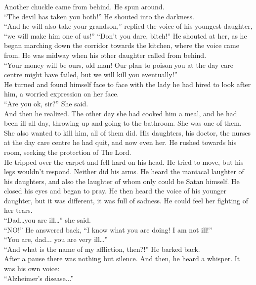 \documentclass[a4paper,onecolumn,11pt]{article}
\begin{document}
\newline
Another chuckle came from behind. He spun around.\\
``The devil has taken you both!'' He shouted into the darkness.\\
``And he will also take your grandson,'' replied the voice of his youngest daughter, ``we will make him one of us!''
``Don't you dare, bitch!'' He shouted at her, as he began marching down the corridor towards the kitchen, where the voice came from. He was midway when his other daughter called from behind.\\
``Your money will be ours, old man! Our plan to poison you at the day care centre might have failed, but we will kill you eventually!''\\
\newline
He turned and found himself face to face with the lady he had hired to look after him, a worried expression on her face.\\
“Are you ok, sir?'' She said.\\
And then he realized. The other day she had cooked him a meal, and he had been ill all day, throwing up and going to the bathroom. She was one of them. She also wanted to kill him, all of them did. His daughters, his doctor, the nurses at the day care centre he had quit, and now even her. He rushed towards his room, seeking the protection of The Lord.\\
\newline
He tripped over the carpet and fell hard on his head. He tried to move, but his legs wouldn’t respond. Neither did his arms. He heard the maniacal laughter of his daughters, and also the laughter of whom only could be Satan himself. He closed his eyes and began to pray. He then heard the voice of his younger daughter, but it was different, it was full of sadness. He could feel her fighting of her tears.\\
``Dad\ldots you are ill\ldots'' she said.\\
``NO!'' He answered back, ``I know what you are doing! I am not ill!''\\
``You are, dad... you are very ill\ldots''\\
``And what is the name of my affliction, then?!'' He barked back.\\
After a pause there was nothing but silence. And then, he heard a whisper. It was his own voice:\\
``Alzheimer’s disease...''

\newpage
\end{document}
